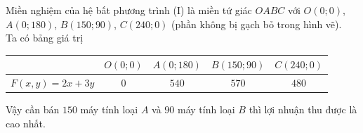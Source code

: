 \begin{bt}
{\begin{center}
		\end{center}
		Miền nghiệm của hệ bất phương trình (I) là miền tứ giác $OABC$ với $O(0;0)$, $A(0;180)$, $B(150;90)$, $C(240;0)$ (phần không bị gạch bỏ  trong hình vẽ).\\
		 Ta có bảng giá trị
		\begin{center}
			\begin{tabular}{|c|c|c|c|c|}
				 \hline
				& $O(0;0)$ & $A(0;180)$ & $B(150;90)$  & $C(240;0)$ \\
				\hline 
				$F(x,y)=2x+3y$  & $0$ & $540$ & $570$ & $480$ \\
				 \hline
			\end{tabular}
		\end{center}
		Vậy cần bán $150$ máy tính loại $A$ và $90$ máy tính loại $B$ thì lợi nhuận thu được  là cao nhất.
	} 
\end{bt}

